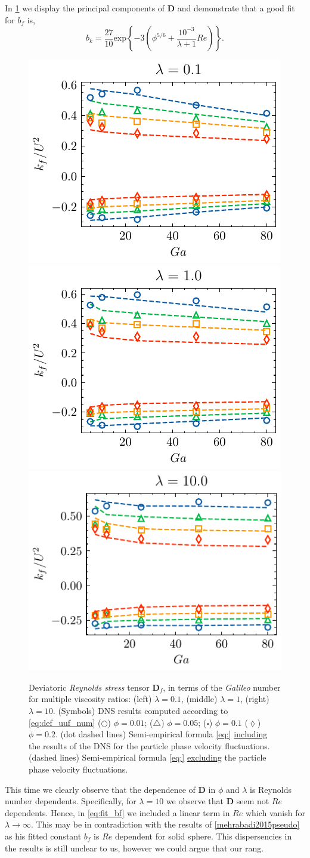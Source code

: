 In \ref{fig:bf} we display the principal components of $\textbf{D}$ and demonstrate that a good fit for $b_f$ is, 
\begin{equation*}
    b_k = \frac{27}{10}  \text{exp}\left\{- 3\left(\phi^{5/6} + \frac{10^{-3}}{\lambda+1}Re\right)\right\}. 
\end{equation*}
\begin{figure}
    \centering
    \includegraphics[height = 0.25\textwidth]{image/HOMOGENEOUS_final/CA/D2_l_0.pdf}
    \includegraphics[height = 0.25\textwidth]{image/HOMOGENEOUS_final/CA/D2_l_1.pdf}
    \includegraphics[height = 0.25\textwidth]{image/HOMOGENEOUS_final/CA/D2_l_10.pdf}
    \caption{Deviatoric \textit{Reynolds stress} tensor $\textbf{D}_f$, in terms of the \textit{Galileo} number for multiple viscosity ratios:
    (left) $\lambda = 0.1$,
    (middle) $\lambda = 1$,
    (right) $\lambda = 10$. 
    (Symbols) DNS results computed according to \ref{eq:def_uuf_num}
    ($\pmb\bigcirc$) $\phi = 0.01$; ($\pmb\triangle$) $ \phi = 0.05$; ($\pmb\square$) $\phi = 0.1$ ($\pmb\lozenge$) $\phi = 0.2$.
    (dot dashed lines) Semi-empirical formula \ref{eq:} \underline{including} the results of the DNS for the particle phase velocity fluctuations. 
    (dashed lines) Semi-empirical formula \ref{eq:} \underline{excluding} the particle phase velocity fluctuations. 
    }
    \label{fig:bf}
\end{figure}
This time we clearly observe that the dependence of $\textbf{D}$ in $\phi$ and $\lambda$ is Reynolds number dependents. 
Specifically, for $\lambda = 10$ we observe that $\textbf{D}$ seem not $Re$ dependents. 
Hence, in  \ref{eq:fit_bf} we included a linear term in  $Re$ which vanish for $\lambda \to \infty$. 
This may be in contradiction with the results of \ref{mehrabadi2015pseudo} as his fitted constant $b_f$ is $Re$ dependent for solid sphere. 
This dispersencies in the results is still unclear to us, however we could argue that our rang.  


